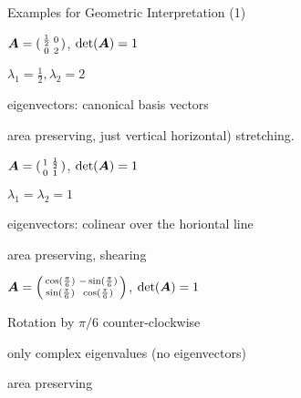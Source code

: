 \documentclass[handout,fleqn,aspectratio=169]{beamer}
\begin{document}
\begin{frame}{Examples for Geometric Interpretation (1)}

\plitemsep 0.03in
{
\small
\bce
\item $\bm{A} = 
(\begin{smallmatrix}
\frac{1}{2} & 0 \cr
0 & 2
\end{smallmatrix})$, $\det(\bm{A}) = 1$ 

\bci
\item $\lambda_1 = \frac{1}{2}, \lambda_2 = 2$
\item eigenvectors: canonical basis vectors
\item area preserving, just vertical horizontal) stretching. 
\eci

\item $\bm{A} = 
(\begin{smallmatrix}
1 & \frac{1}{2} \cr
0 & 1
\end{smallmatrix})$, $\det(\bm{A}) = 1$
\bci
\item $\lambda_1 = \lambda_2 = 1$
\item eigenvectors: colinear over the horiontal line
\item area preserving, shearing
\eci

\item $\bm{A} = 
\left(\begin{smallmatrix}
\cos(\frac{\pi}{6}) & -\sin(\frac{\pi}{6}) \cr
\sin(\frac{\pi}{6}) & \cos(\frac{\pi}{6})
\end{smallmatrix} \right)$, $\det(\bm{A}) = 1$
\bci
\item Rotation by $\pi/6$ counter-clockwise
\item only complex eigenvalues (no eigenvectors)
\item area preserving
\eci

\ece
}
{
\vspace{-0.4cm}
\centering
{}

\vspace{0.1cm}


\vspace{0.1cm}

}

\end{frame}
\end{document}
